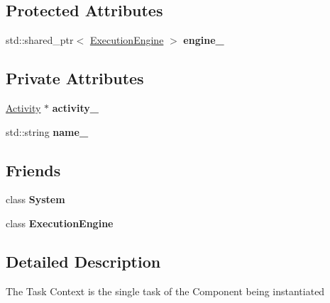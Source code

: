 \subsection*{Protected Attributes}
\begin{DoxyCompactItemize}
\item 
\hypertarget{classcoco_1_1_task_context_a7f6706f1339e8c6e8972c3c9244d5efe}{std\-::shared\-\_\-ptr$<$ \hyperlink{classcoco_1_1_execution_engine}{Execution\-Engine} $>$ {\bfseries engine\-\_\-}}\label{classcoco_1_1_task_context_a7f6706f1339e8c6e8972c3c9244d5efe}

\end{DoxyCompactItemize}
\subsection*{Private Attributes}
\begin{DoxyCompactItemize}
\item 
\hypertarget{classcoco_1_1_task_context_a3e64c0ed592191c264ccb5705e17dfcc}{\hyperlink{classcoco_1_1_activity}{Activity} $\ast$ {\bfseries activity\-\_\-}}\label{classcoco_1_1_task_context_a3e64c0ed592191c264ccb5705e17dfcc}

\item 
\hypertarget{classcoco_1_1_task_context_a59000e222df9d2d51cfadd3a358872b6}{std\-::string {\bfseries name\-\_\-}}\label{classcoco_1_1_task_context_a59000e222df9d2d51cfadd3a358872b6}

\end{DoxyCompactItemize}
\subsection*{Friends}
\begin{DoxyCompactItemize}
\item 
\hypertarget{classcoco_1_1_task_context_af18a9ee98e70982bfe2975391d7221a5}{class {\bfseries System}}\label{classcoco_1_1_task_context_af18a9ee98e70982bfe2975391d7221a5}

\item 
\hypertarget{classcoco_1_1_task_context_a9b68196ad6ed6fa11eb4454434b39bb5}{class {\bfseries Execution\-Engine}}\label{classcoco_1_1_task_context_a9b68196ad6ed6fa11eb4454434b39bb5}

\end{DoxyCompactItemize}


\subsection{Detailed Description}
The Task Context is the single task of the Component being instantiated

